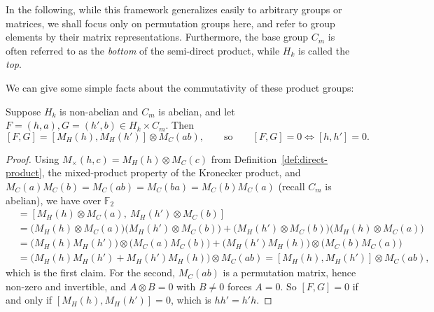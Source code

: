 In the following, while this framework generalizes easily to arbitrary groups or matrices, we shall focus only on permutation groups here, and refer to group elements by their matrix representations. Furthermore, the base group $C_m$ is often referred to as the \emph{bottom} of the semi-direct product, while $H_k$ is called the \emph{top}.

We can give some simple facts about the commutativity of these product groups:

\begin{lemma}\label{lemma:dpk-commutivity}
Suppose $H_k$ is non-abelian and $C_m$ is abelian, and let $F = (h,a), G = (h',b)\in H_k\times C_m$. Then
\begin{equation}\label{eq:dpk-commutivity}
    [F,G] = [M_H(h), M_H(h')]\otimes M_C(ab),
    \qquad\text{so}\qquad
    [F,G] = 0 \iff [h,h'] = 0.
\end{equation}
\end{lemma}

\begin{proof}
Using $M_\times(h,c) = M_H(h)\otimes M_C(c)$ from Definition~\ref{def:direct-product}, the mixed-product property of the Kronecker product, and $M_C(a)M_C(b) = M_C(ab) = M_C(ba) = M_C(b)M_C(a)$ (recall $C_m$ is abelian), we have over $\mathbb F_2$
\begin{align*}
        [F,G] &= \left[M_H(h)\otimes M_C(a),\ M_H(h')\otimes M_C(b)\right] \\
        &= \big(M_H(h)\otimes M_C(a)\big) \big( M_H(h')\otimes M_C(b)\big) +\big(M_H(h')\otimes M_C(b)\big)\big(M_H(h)\otimes M_C(a)\big)\\
        &= \big( M_H(h)  M_H(h')\big)\otimes \big(M_C(a) M_C(b)\big) + \big(M_H(h')  M_H(h)\big)\otimes \big(M_C(b) M_C(a)\big)\\
        &= \big( M_H(h)  M_H(h') +  M_H(h')  M_H(h) \big)\otimes M_C(ab)
        = [M_H(h),M_H(h')]\otimes M_C(ab),
\end{align*}
which is the first claim. For the second, $M_C(ab)$ is a permutation matrix, hence non-zero and invertible, and $A\otimes B = 0$ with $B\neq 0$ forces $A = 0$. So $[F,G] = 0$ if and only if $[M_H(h),M_H(h')] = 0$, which is $hh' = h'h$.
\end{proof}

